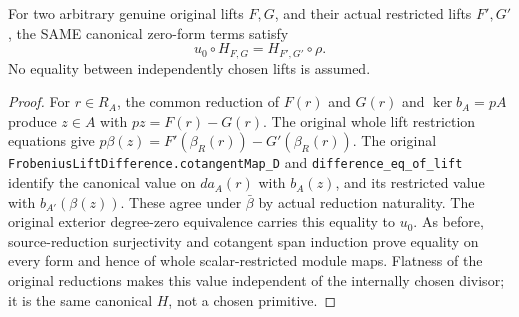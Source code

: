 \begin{theorem}
\label{thm:di-witt-native-arbitrary-restriction-H}
\leanok
{}
For two arbitrary genuine original lifts $F,G$, and their actual
restricted lifts $F',G'$, the SAME canonical zero-form terms satisfy
\[
 u_0\circ H_{F,G}=H_{F',G'}\circ\rho.
\]
No equality between independently chosen lifts is assumed.
\end{theorem}
\begin{proof}
For $r\in R_A$, the common reduction of $F(r)$ and $G(r)$ and
$\ker b_A=pA$ produce $z\in A$ with
$pz=F(r)-G(r)$. The original whole lift restriction equations give
$p\beta(z)=F'(\beta_R(r))-G'(\beta_R(r))$.
The original \texttt{FrobeniusLiftDifference.\allowbreak{}cotangentMap\_\allowbreak{}D} and
\texttt{difference\_\allowbreak{}eq\_\allowbreak{}of\_\allowbreak{}lift} identify the canonical value on
$d a_A(r)$ with $b_A(z)$, and its restricted value with
$b_{A'}(\beta(z))$. These agree under $\bar\beta$ by actual
reduction naturality. The original exterior degree-zero equivalence
carries this equality to $u_0$. As before, source-reduction
surjectivity and cotangent span induction prove equality on every
form and hence of whole scalar-restricted module maps. Flatness of
the original reductions makes this value independent of the internally
chosen divisor; it is the same canonical $H$, not a chosen primitive.
\end{proof}

